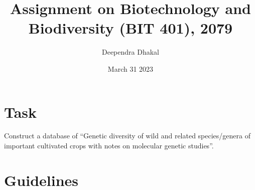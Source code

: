 \documentclass[
]{article}
\title{Assignment on Biotechnology and Biodiversity (BIT 401), 2079}
\author{Deependra Dhakal}
\date{March 31 2023}
\begin{document}
\maketitle

\hypertarget{task}{%
\section{Task}\label{task}}

Construct a database of ``Genetic diversity of wild and related species/genera of important cultivated crops with notes on molecular genetic studies''.

\hypertarget{guidelines}{%
\section{Guidelines}\label{guidelines}}
\end{document}
